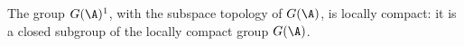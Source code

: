 The group $G(\A)^1$, with the subspace topology of $G(\A)$, is locally compact: it is a closed subgroup of the locally compact group $G(\A)$.
